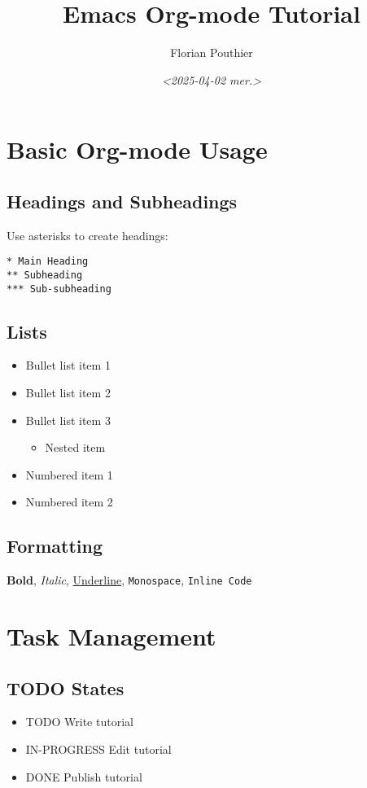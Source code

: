 \documentclass[11pt]{article}
\author{Florian Pouthier}
\date{\textit{<2025-04-02 mer.>}}
\title{Emacs Org-mode Tutorial}
\begin{document}
\maketitle
\tableofcontents


\section{Basic Org-mode Usage}
\label{sec:org281265e}

\subsection{Headings and Subheadings}
\label{sec:org0bec0dc}
Use asterisks to create headings:
\begin{verbatim}
* Main Heading
** Subheading
*** Sub-subheading
\end{verbatim}

\subsection{Lists}
\label{sec:orgbf32bd8}
\begin{itemize}
\item Bullet list item 1
\item Bullet list item 2
\item Bullet list item 3
\begin{itemize}
\item Nested item
\end{itemize}
\item Numbered item 1
\item Numbered item 2
\end{itemize}

\subsection{Formatting}
\label{sec:orgd0a226b}
\textbf{Bold}, \emph{Italic}, \uline{Underline}, \texttt{Monospace}, \texttt{Inline Code}


\section{Task Management}
\label{sec:orgbce34fa}

\subsection{{\bfseries\sffamily TODO} States}
\label{sec:org6400089}
\begin{itemize}
\item TODO Write tutorial
\item IN-PROGRESS Edit tutorial
\item DONE Publish tutorial
\end{itemize}
\end{document}
